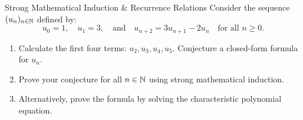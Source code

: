 \begin{exercise}{Strong Mathematical Induction \& Recurrence Relations}
Consider the sequence $(u_n)_{n \in \mathbb{N}}$ defined by:
\[
u_0 = 1, \quad u_1 = 3, \quad \text{and} \quad u_{n+2} = 3u_{n+1} - 2u_n \quad \text{for all } n \ge 0.
\]
\begin{enumerate}[leftmargin=1.5em,itemsep=2pt]
  \item Calculate the first four terms: $u_2, u_3, u_4, u_5$. Conjecture a closed-form formula for $u_n$.
  \item Prove your conjecture for all $n \in \mathbb{N}$ using strong mathematical induction.
  \item Alternatively, prove the formula by solving the characteristic polynomial equation.
\end{enumerate}
\end{exercise}

\begin{tabletworkspace}[5.0cm]
\end{tabletworkspace}

